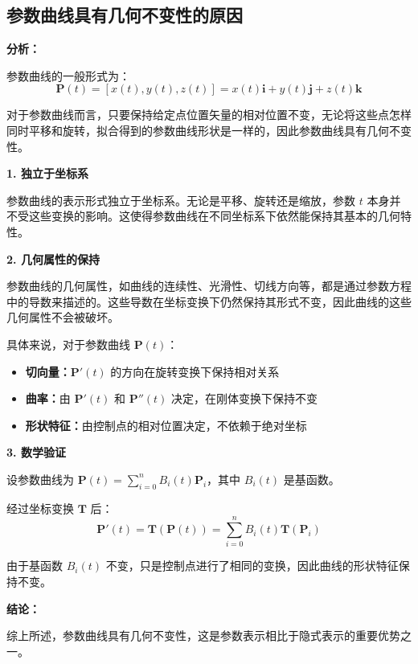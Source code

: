 \documentclass[12pt,a4paper]{article}
\begin{document}
\subsection{参数曲线具有几何不变性的原因}

\begin{tcolorbox}[breakable]
\textbf{分析：}

参数曲线的一般形式为：
\begin{equation}
\mathbf{P}(t) = [x(t), y(t), z(t)] = x(t)\mathbf{i} + y(t)\mathbf{j} + z(t)\mathbf{k}
\end{equation}

对于参数曲线而言，只要保持给定点位置矢量的相对位置不变，无论将这些点怎样同时平移和旋转，拟合得到的参数曲线形状是一样的，因此参数曲线具有几何不变性。

\textbf{1. 独立于坐标系}

参数曲线的表示形式独立于坐标系。无论是平移、旋转还是缩放，参数 $t$ 本身并不受这些变换的影响。这使得参数曲线在不同坐标系下依然能保持其基本的几何特性。

\textbf{2. 几何属性的保持}

参数曲线的几何属性，如曲线的连续性、光滑性、切线方向等，都是通过参数方程中的导数来描述的。这些导数在坐标变换下仍然保持其形式不变，因此曲线的这些几何属性不会被破坏。

具体来说，对于参数曲线 $\mathbf{P}(t)$：
\begin{itemize}
\item \textbf{切向量：}$\mathbf{P}'(t)$ 的方向在旋转变换下保持相对关系
\item \textbf{曲率：}由 $\mathbf{P}'(t)$ 和 $\mathbf{P}''(t)$ 决定，在刚体变换下保持不变
\item \textbf{形状特征：}由控制点的相对位置决定，不依赖于绝对坐标
\end{itemize}

\textbf{3. 数学验证}

设参数曲线为 $\mathbf{P}(t) = \sum_{i=0}^{n} B_i(t) \mathbf{P}_i$，其中 $B_i(t)$ 是基函数。

经过坐标变换 $\mathbf{T}$ 后：
\begin{equation}
\mathbf{P}'(t) = \mathbf{T}(\mathbf{P}(t)) = \sum_{i=0}^{n} B_i(t) \mathbf{T}(\mathbf{P}_i)
\end{equation}

由于基函数 $B_i(t)$ 不变，只是控制点进行了相同的变换，因此曲线的形状特征保持不变。

\textbf{结论：}

综上所述，参数曲线具有几何不变性，这是参数表示相比于隐式表示的重要优势之一。
\end{tcolorbox}
\end{document}

